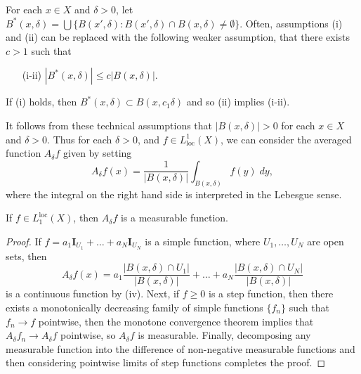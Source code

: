 \begin{remark}
  For each $x \in X$ and $\delta > 0$, let $B^*(x,\delta) = \bigcup \{ B(x',\delta) : B(x',\delta) \cap B(x,\delta) \neq \emptyset \}$. Often, assumptions (i) and (ii) can be replaced with the following weaker assumption, that there exists $c > 1$ such that
  \begin{itemize}
    \item[(i-ii)] $|B^*(x,\delta)| \leq c |B(x,\delta)|$.
  \end{itemize}
  If (i) holds, then $B^*(x,\delta) \subset B(x,c_1\delta)$ and so (ii) implies (i-ii).
\end{remark}

It follows from these technical assumptions that $|B(x,\delta)| > 0$ for each $x \in X$ and $\delta > 0$. Thus for each $\delta > 0$, and $f \in L^1_{\text{loc}}(X)$, we can consider the averaged function $A_\delta f$ given by setting
%
\[ A_\delta f(x) = \frac{1}{|B(x,\delta)|} \int_{B(x,\delta)} f(y)\; dy, \]
%
where the integral on the right hand side is interpreted in the Lebesgue sense.

\begin{lemma}
  If $f \in L_1^{\text{loc}}(X)$, then $A_\delta f$ is a measurable function.
\end{lemma}
\begin{proof}
  If $f = a_1 \mathbf{I}_{U_1} + \dots + a_N \mathbf{I}_{U_N}$ is a simple function, where $U_1,\dots,U_N$ are open sets, then
  \[ A_\delta f(x) = a_1 \frac{|B(x,\delta) \cap U_1|}{|B(x,\delta)|} + \dots + a_N \frac{|B(x,\delta) \cap U_N|}{|B(x,\delta)|} \]
  is a continuous function by (iv). Next, if $f \geq 0$ is a step function, then there exists a monotonically decreasing family of simple functions $\{ f_n \}$ such that $f_n \to f$ pointwise, then the monotone convergence theorem implies that $A_\delta f_n \to A_\delta f$ pointwise, so $A_\delta f$ is measurable. Finally, decomposing any measurable function into the difference of non-negative measurable functions and then considering pointwise limits of step functions completes the proof.
\end{proof}

